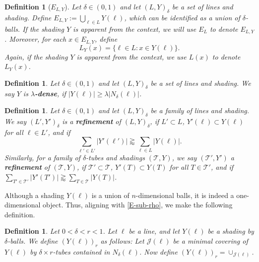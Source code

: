 \documentclass{amsart}
\numberwithin{equation}{section}
\newtheorem{definition}[theorem]{Definition}
\newcommand{\de}{\delta}
\newcommand{\la}{\lambda}
\newcommand{\cj}{\mathcal J}
\newcommand{\cT}{{\mathcal T}}
\begin{document}
\begin{definition}[$E_{L,Y}$]
\label{E-L-def}
Let $\de\in(0,1)$ and let $(L,Y)_\delta$ be a set of lines and shading.
Define $E_{L,Y}:=\bigcup_{\ell\in L}Y(\ell)$, which can be identified as a union of $\de$-balls. If the shading $Y$ is apparent from the context, we will use $E_{L}$ to denote $E_{L,Y}$.
Moreover, for each $x\in E_{L,Y}$, define 
\begin{equation}
    L_Y(x)=\{\ell\in L:x\in Y(\ell)\}.
\end{equation}
Again, if the shading $Y$ is apparent from the context, we use $L(x)$ to denote $L_Y(x)$.
\end{definition}

\begin{definition}
\label{lambda-dense-def}
Let $\de\in(0,1)$ and let $(L,Y)_\delta$ be a set of lines and shading.
We say $Y$ is {\bf $\la$-dense}, if $|Y(\ell)|\geq \la |N_\de(\ell)|$.
\end{definition}

\begin{definition}
Let $\de\in(0,1)$ and let $(L,Y)_\delta$ be a family of lines and shading.
We say $(L',Y')_\de$ is a {\bf refinement} of $(L,Y)_\delta$, if $L'\subset L$, $Y'(\ell)\subset Y(\ell)$ for all $\ell\in L'$, and if
\begin{equation}
    \sum_{\ell'\in L'}|Y'(\ell')|\gtrapprox\sum_{\ell\in L}|Y(\ell)|.
\end{equation}
Similarly, for a family of $\de$-tubes and shadings $(\cT,Y)$, we say $(\cT',Y')$ a {\bf refinement} of $(\cT,Y)$, if $\cT'\subset \cT$, $Y'(T)\subset Y(T)$ for all $T\in \cT'$, and if $\sum_{T'\in \cT'}|Y'(T')|\gtrapprox\sum_{T\in \cT}|Y(T)|$.
\end{definition}

\smallskip

Although a shading $Y(\ell)$ is a union of $n$-dimensional balls, it is indeed a one-dimensional object.
Thus, aligning with \eqref{E-sub-rho}, we make the following definition.

\begin{definition}
\label{tube-segment}
Let $0<\delta<r < 1$. 
Let $\ell$ be a line, and let $Y(\ell)$ be a shading by $\de$-balls. 
We define $(Y(\ell))_r$ as follows:
Let $\cj(\ell)$ be a minimal covering of $Y(\ell)$ by $\de\times r$-tubes contained in $N_\de(\ell)$. 
Now define $(Y(\ell))_r=\cup_{\cj(\ell)}$. 
\end{definition}
\end{document}

